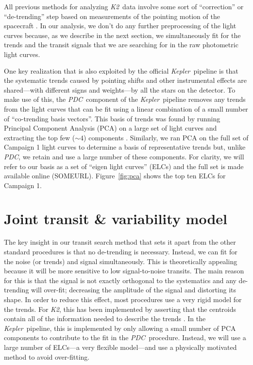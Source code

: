 \documentclass[12pt,preprint]{aastex}
\newcommand{\project}[1]{\textsl{#1}} %
\newcommand{\kepler}{\project{Kepler}}
\newcommand{\KT}{\project{K2}}
\newcommand{\pdc}{\project{PDC}}
\newcommand{\figref}[1]{\ref{fig:#1}}
\newcommand{\Fig}[1]{Figure~\figref{#1}}
\begin{document}
All previous methods for analyzing \KT\ data involve some sort of
``correction'' or ``de-trending'' step based on measurements of the pointing
motion of the spacecraft \citep{Vanderburg:2014, Aigrain:2015,
Crossfield:2015}.
In our analysis, we don't do any further preprocessing of the light curves
because, as we describe in the next section, we simultaneously fit for the
trends and the transit signals that we are searching for in the raw
photometric light curves.

One key realization that is also exploited by the official \kepler\ pipeline
is that the systematic trends caused by pointing shifts and other instrumental
effects are shared---with different signs and weights---by all the stars on
the detector.
To make use of this, the \pdc\ component of the \kepler\ pipeline
removes any trends from the light curves that can be fit using a linear
combination of a small number of ``co-trending basis vectors''.
This basis of trends was found by running Principal Component Analysis (PCA)
on a large set of light curves and extracting the top few ($\sim 4$)
components \citep{pdc1, pdc2}.
Similarly, we ran PCA on the full set of Campaign 1 light curves to determine
a basis of representative trends but, unlike \pdc, we retain and use
a large number of these components.
For clarity, we will refer to our basis as a set of ``eigen light curves''
(ELCs) and the full set is made available online (SOMEURL).
\Fig{pca} shows the top ten ELCs for Campaign 1.


\section{Joint transit \& variability model}
\label{sec:model}

The key insight in our transit search method that sets it apart from the
other standard procedures is that no de-trending is necessary.
Instead, we can fit for the noise (or trends) and signal simultaneously.
This is theoretically appealing because it will be more sensitive to low
signal-to-noise transits.
The main reason for this is that the signal is not exactly orthogonal to the
systematics and any de-trending will over-fit; decreasing the amplitude of the
signal and distorting its shape.
In order to reduce this effect, most procedures use a very rigid model for
the trends.
For \KT, this has been implemented by asserting that the centroids contain
all of the information needed to describe the trends \citep{Vanderburg:2014,
Aigrain:2015, Crossfield:2015}.
In the \kepler\ pipeline, this is implemented by only allowing a small number
of PCA components to contribute to the fit in the \pdc\ procedure.
Instead, we will use a large number of ELCs---a very flexible model---and
use a physically motivated method to avoid over-fitting.
\end{document}
